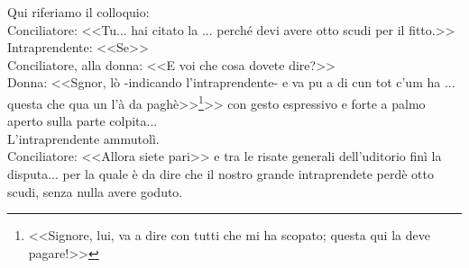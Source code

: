 \indent Qui riferiamo il colloquio:\\
\indent Conciliatore: <<Tu... hai citato la .\:.\:. perché devi avere otto scudi per il fitto.>>\\
\indent Intraprendente: <<Se>>\\
\indent Conciliatore, alla donna: <<E voi che cosa dovete dire?>>\\
\indent Donna: <<Sgnor, lò -indicando l'intraprendente- e va pu a di cun tot c'um ha .\:.\:. questa che qua un l'à da paghè>>\footnote{<<Signore, lui, va a dire con tutti che mi ha scopato; questa qui la deve pagare!>>}>> con gesto espressivo e forte a palmo aperto sulla parte colpita...\\
\indent L'intraprendente ammutolì.\\
\indent Conciliatore: <<Allora siete pari>> e tra le risate generali dell'uditorio finì la disputa... per la quale è da dire che il nostro grande intraprendete perdè otto scudi, senza nulla avere goduto. 



